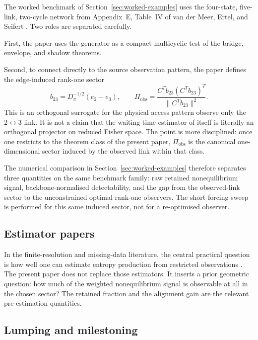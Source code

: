 \documentclass[11pt,a4paper]{article}
\numberwithin{equation}{section}
\theoremstyle{thmcompact}
\theoremstyle{remark}
\begin{document}
The worked benchmark of Section~\ref{sec:worked-examples} uses the four-state, five-link, two-cycle network from Appendix~E, Table~IV of van der Meer, Ertel, and Seifert \cite{vanDerMeerErtelSeifert2022}. Two roles are separated carefully.

First, the paper uses the generator as a compact multicyclic test of the bridge, envelope, and shadow theorems.

Second, to connect directly to the source observation pattern, the paper defines the edge-induced rank-one sector
\begin{equation}
b_{23}=D_\pi^{-1/2}(e_2-e_3),
\qquad
\Pi_{\mathrm{obs}}=\frac{C^Tb_{23}(C^Tb_{23})^T}{\|C^Tb_{23}\|^2}.
\end{equation}
This is an orthogonal surrogate for the physical access pattern observe only the \(2\leftrightarrow 3\) link. It is not a claim that the waiting-time estimator of \cite{vanDerMeerErtelSeifert2022} itself is literally an orthogonal projector on reduced Fisher space. The point is more disciplined: once one restricts to the theorem class of the present paper, \(\Pi_{\mathrm{obs}}\) is the canonical one-dimensional sector induced by the observed link within that class.

The numerical comparison in Section~\ref{sec:worked-examples} therefore separates three quantities on the same benchmark family: raw retained nonequilibrium signal, backbone-normalised detectability, and the gap from the observed-link sector to the unconstrained optimal rank-one observers. The short forcing sweep is performed for this same induced sector, not for a re-optimised observer.

\subsection{Estimator papers}

In the finite-resolution and missing-data literature, the central practical question is how well one can estimate entropy production from restricted observations \cite{Seifert2012,BaiesiNishiyamaFalasco2023,FritzErtelSeifert2024}. The present paper does not replace those estimators. It inserts a prior geometric question: how much of the weighted nonequilibrium signal is observable at all in the chosen sector? The retained fraction and the alignment gain are the relevant pre-estimation quantities.

\subsection{Lumping and milestoning}
\end{document}
